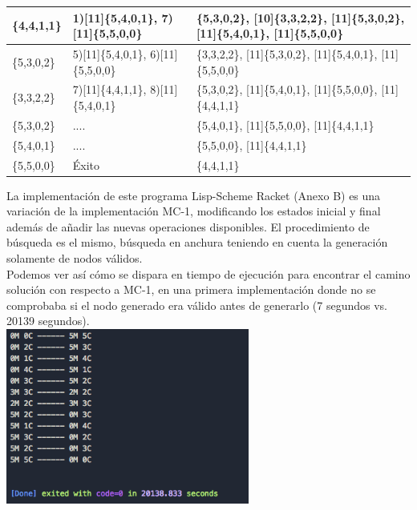 \documentclass{article}
\begin{document}
\begin{center}
\begin{longtable}{ |p{2cm}|p{2cm}|>{\raggedright\arraybackslash}p{7cm}|  }
    \hline
    [10]\{4,4,1,1\} & 1)[11]\{5,4,0,1\}, 7)[11]\{5,5,0,0\} & [10]\{5,3,0,2\}, [10]\{3,3,2,2\}, [11]\{5,3,0,2\}, [11]\{5,4,0,1\}, [11]\{5,5,0,0\} \\ 
    \hline
    [10]\{5,3,0,2\} & 5)[11]\{5,4,0,1\}, 6)[11]\{5,5,0,0\} & [10]\{3,3,2,2\}, [11]\{5,3,0,2\}, [11]\{5,4,0,1\}, [11]\{5,5,0,0\} \\ 
    \hline
    [10]\{3,3,2,2\} & 7)[11]\{4,4,1,1\}, 8)[11]\{5,4,0,1\} & [11]\{5,3,0,2\}, [11]\{5,4,0,1\}, [11]\{5,5,0,0\}, [11]\{4,4,1,1\} \\ 
    \hline
    [11]\{5,3,0,2\} & .... & [11]\{5,4,0,1\}, [11]\{5,5,0,0\}, [11]\{4,4,1,1\} \\ 
    \hline
    [11]\{5,4,0,1\} & .... & [11]\{5,5,0,0\}, [11]\{4,4,1,1\} \\ 
    \hline
    [11]\{5,5,0,0\} & Éxito & [11]\{4,4,1,1\} \\ 
    \hline
  \end{longtable}
\end{center}

La implementación de este programa Lisp-Scheme Racket (Anexo B) es una variación de la implementación MC-1, modificando los estados inicial y final además de añadir las nuevas operaciones disponibles. El procedimiento de búsqueda es el mismo, búsqueda en anchura teniendo en cuenta la generación solamente de nodos válidos. \\

\pagebreak
Podemos ver así cómo se dispara en tiempo de ejecución para encontrar el camino solución con respecto a MC-1, en una primera implementación donde no se comprobaba si el nodo generado era válido antes de generarlo (7 segundos vs. 20139 segundos). \\
\includegraphics[width=8cm]{resources/mc-3} \\
\end{document}
